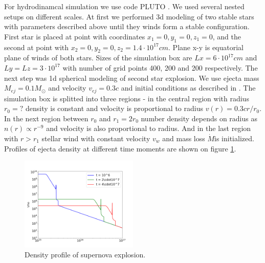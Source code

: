 \documentclass[a4paper,12pt]{extreport}
\begin{document}
For hydrodinamcal simulation we use code PLUTO \cite{MignonePluto}. We used several nested setups on different scales. At first we performed 3d modeling of two stable stars with parameters described above until they winds form a stable configuration. First star is placed at point with coordinates $x_1 = 0, y_1 = 0, z_1 = 0$, and the second at point with $x_2 = 0, y_2 = 0, z_2 = 1.4\cdot10^{17} cm$. Plane x-y is equatorial plane of winds of both stars. Sizes of the simulation box are $Lx = 6\cdot 10^{17} cm$ and $Ly = Lz = 3\cdot 10^{17}$ with number of grid points 400, 200 and 200 respectively. The next step was 1d spherical modeling of second star explosion. We use ejecta mass $M_{ej} = 0.1 M_\odot$ and velocity $v_{ej} = 0.3 c$ and initial conditions as described in \cite{ChevalierLiang1989, Petruk2021snr}. The simulation box is splitted into three regions - in the central region with radius $r_0 = ?$ density is constant and velocity is proportional to radius $v(r) = 0.3 c r/r_0$. In the next region between $r_0$ and $r_1 = 2 r_0$ number density depends on radius as $n(r) \propto r^{-9}$ and velocity is also proportional to radius. And in the last region with $r > r_1$ stellar wind with constant velocity $v_w$ and mass loss $\dot{M}$is initialized. Profiles of ejecta density at different time moments are shown on figure \ref{snr}.
\begin{figure}
	\centering
	\includegraphics[width=0.5\textwidth]{./fig/snr.png} 
	\caption{Density profile of supernova explosion.}
	\label{snr}
\end{figure}
\end{document}
